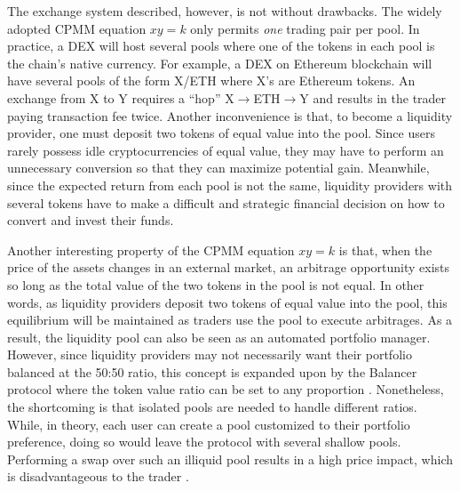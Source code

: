 \documentclass[12pt,a4paper]{article}
\begin{document}
The exchange system described, however, is not without drawbacks. The widely adopted CPMM equation $xy=k$ only permits \emph{one} trading pair per pool. In practice, a DEX will host several pools where one of the tokens in each pool is the chain's native currency. For example, a DEX on Ethereum blockchain will have several pools of the form X/ETH where X's are Ethereum tokens. An exchange from X to Y requires a ``hop'' X$\rightarrow$ETH$\rightarrow$Y and results in the trader paying transaction fee twice. Another inconvenience is that, to become a liquidity provider, one must deposit two tokens of equal value into the pool. Since users rarely possess idle cryptocurrencies of equal value, they may have to perform an unnecessary conversion so that they can maximize potential gain. Meanwhile, since the expected return from each pool is not the same, liquidity providers with several tokens have to make a difficult and strategic financial decision on how to convert and invest their funds.

Another interesting property of the CPMM equation $xy=k$ is that, when the price of the assets changes in an external market, an arbitrage opportunity exists so long as the total value of the two tokens in the pool is not equal. In other words, as liquidity providers deposit two tokens of equal value into the pool, this equilibrium will be maintained as traders use the pool to execute arbitrages. As a result, the liquidity pool can also be seen as an automated portfolio manager.
However, since liquidity providers may not necessarily want their portfolio balanced at the 50:50 ratio, this concept is expanded upon by the Balancer protocol where the token value ratio can be set to any proportion \cite{MM}. Nonetheless, the shortcoming is that isolated pools are needed to handle different ratios. While, in theory, each user can create a pool customized to their portfolio preference, doing so would leave the protocol with several shallow pools. Performing a swap over such an illiquid pool results in a high price impact, which is disadvantageous to the trader \cite{W}.
\end{document}
